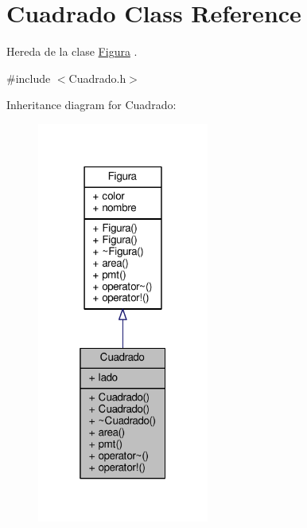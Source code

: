 \hypertarget{class_cuadrado}{\section{Cuadrado Class Reference}
\label{class_cuadrado}
}


Hereda de la clase \hyperlink{class_figura}{Figura} .  




{\ttfamily \#include $<$Cuadrado.\+h$>$}



Inheritance diagram for Cuadrado\+:
\nopagebreak
\begin{figure}[H]
\begin{center}
\leavevmode
\includegraphics[width=160pt]{class_cuadrado__inherit__graph}
\end{center}
\end{figure}
